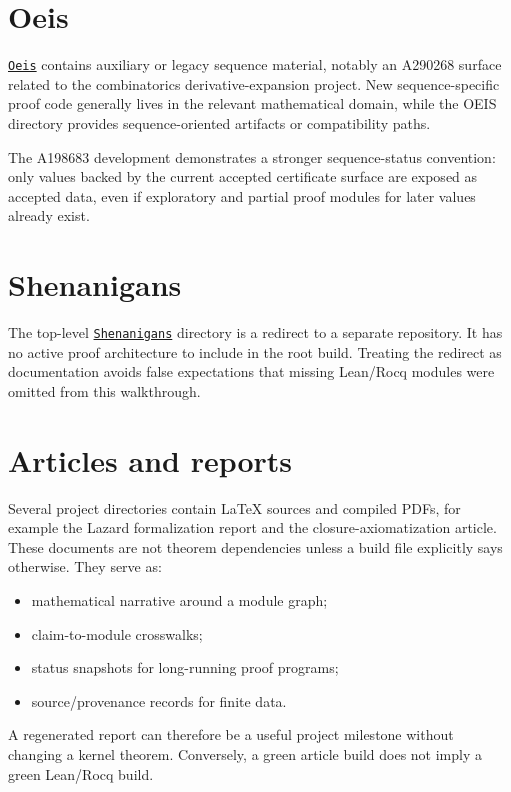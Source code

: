 \documentclass[
  10pt,
  a4paper,
  twoside,
  open=any,
  parskip=half,
  headings=big
]{scrreprt}
\newcommand{\CommitFull}{675d0a2ff0fc624fba199e006049016ba806f40a}
\newcommand{\RepoTreeBase}{https://github.com/VladimirReshetnikov/ProveIt/tree/\CommitFull/}
\newcommand{\RepoDir}[1]{%
  \href{\RepoTreeBase\detokenize{#1}}{\nolinkurl{#1}}}
\begin{document}
\section{Oeis}

\RepoDir{Oeis} contains auxiliary or legacy sequence material, notably an
A290268 surface related to the combinatorics derivative-expansion project.
New sequence-specific proof code generally lives in the relevant mathematical
domain, while the OEIS directory provides sequence-oriented artifacts or
compatibility paths.

The A198683 development demonstrates a stronger sequence-status convention:
only values backed by the current accepted certificate surface are exposed as
accepted data, even if exploratory and partial proof modules for later values
already exist.

\section{Shenanigans}

The top-level \RepoDir{Shenanigans} directory is a redirect to a separate
repository.  It has no active proof architecture to include in the root build.
Treating the redirect as documentation avoids false expectations that missing
Lean/Rocq modules were omitted from this walkthrough.

\section{Articles and reports}

Several project directories contain \LaTeX{} sources and compiled PDFs, for
example the Lazard formalization report and the closure-axiomatization article.
These documents are not theorem dependencies unless a build file explicitly
says otherwise.  They serve as:

\begin{itemize}
  \item mathematical narrative around a module graph;
  \item claim-to-module crosswalks;
  \item status snapshots for long-running proof programs;
  \item source/provenance records for finite data.
\end{itemize}

A regenerated report can therefore be a useful project milestone without
changing a kernel theorem.  Conversely, a green article build does not imply
a green Lean/Rocq build.
\end{document}
